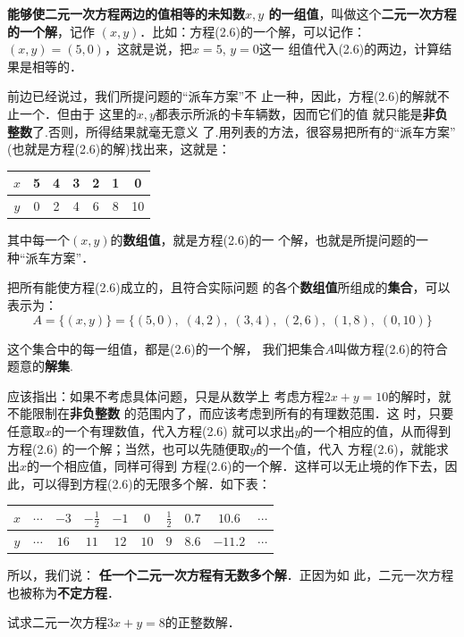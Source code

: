 \textbf{能够使二元一次方程两边的值相等的未知数$x,y$
的一组值}，叫做这个\textbf{二元一次方程的一个解}，记作
$(x,y)$．比如：方程(2.6)的一个解，可以记作：
 $ (x,   y)=(5,  0)$，这就是说，把$x=5$, $y=0$这一
组值代入(2.6)的两边，计算结果是相等的．

    前边已经说过，我们所提问题的“派车方案”不
止一种，因此，方程(2.6)的解就不止一个．但由于
这里的$x,  y$都表示所派的卡车辆数，因而它们的值
就只能是\textbf{非负整数}了.否则，所得结果就毫无意义
了.用列表的方法，很容易把所有的“派车方案”
  (也就是方程(2.6)的解)找出来，这就是：
\begin{center}
    \begin{tabular}{c|cccccc}
        \hline
  $x$ &5&4&3&2&1&0\\
  \hline    
  $y$ &0&2&4&6&8&10\\
  \hline
    \end{tabular}
\end{center}
其中每一个$(x,y)$的\textbf{数组值}，就是方程(2.6)的一
个解，也就是所提问题的一种“派车方案”．

    把所有能使方程(2.6)成立的，且符合实际问题
的各个\textbf{数组值}所组成的\textbf{集合}，可以表示为：
\[A=\{(x,y)\}=\{(5,0),\; (4,2),\;(3,4),\;(2,6),\;(1,8),\;(0,10)\}\]

这个集合中的每一组值，都是(2.6)的一个解，
我们把集合$A$叫做方程(2.6)的符合题意的\textbf{解集}.

    应该指出：如果不考虑具体问题，只是从数学上
考虑方程$2x + y=10$的解时，就不能限制在\textbf{非负整数}
的范围内了，而应该考虑到所有的有理数范围．这
时，只要任意取$x$的一个有理数值，代入方程(2.6)
就可以求出$y$的一个相应的值，从而得到方程(2.6)
的一个解；当然，也可以先随便取$y$的一个值，代入
方程(2.6)，就能求出$x$的一个相应值，同样可得到
方程(2.6)的一个解．这样可以无止境的作下去，因
此，可以得到方程(2.6)的无限多个解．如下表：
\begin{center}
    \begin{tabular}{c|ccccccccc}
        \hline
  $x$ &$\cdots$& $-3$ & $-\frac{1}{2}$  & $-1$  & $0$  & $\frac{1}{2}$ & $0.7$ &$10.6$  &$\cdots$\\
  \hline    
  $y$ &$\cdots$& $16$ & $11$  & $12$  &  $10$ & $9$ & $8.6$  &$-11.2$ &$\cdots$\\
  \hline
    \end{tabular}
\end{center}

所以，我们说：
\textbf{任一个二元一次方程有无数多个解}．正因为如
此，二元一次方程也被称为\textbf{不定方程}．

\begin{example}
    试求二元一次方程$3x +y=8$的正整数解．
\end{example}

